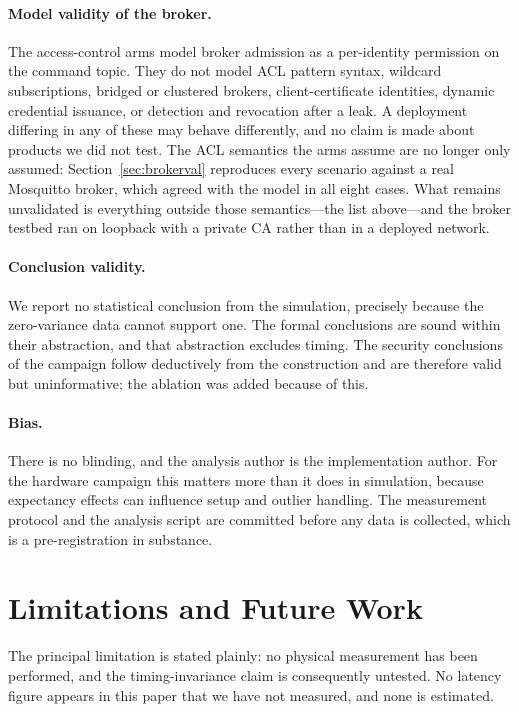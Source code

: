 \paragraph{Model validity of the broker.} The access-control arms model broker admission as a
per-identity permission on the command topic. They do not model ACL pattern syntax, wildcard
subscriptions, bridged or clustered brokers, client-certificate identities, dynamic credential
issuance, or detection and revocation after a leak. A deployment differing in any of these may
behave differently, and no claim is made about products we did not test. The ACL semantics the arms assume are
no longer only assumed: Section~\ref{sec:brokerval} reproduces every scenario against a real
Mosquitto broker, which agreed with the model in all eight cases. What remains unvalidated is
everything outside those semantics---the list above---and the broker testbed ran on loopback
with a private CA rather than in a deployed network.

\paragraph{Conclusion validity.} We report no statistical conclusion from the simulation,
precisely because the zero-variance data cannot support one. The formal conclusions are sound
within their abstraction, and that abstraction excludes timing. The security conclusions of the
campaign follow deductively from the construction and are therefore valid but uninformative;
the ablation was added because of this.

\paragraph{Bias.} There is no blinding, and the analysis author is the implementation author. For
the hardware campaign this matters more than it does in simulation, because expectancy effects
can influence setup and outlier handling. The measurement protocol and the analysis script are
committed before any data is collected, which is a pre-registration in substance.

\section{Limitations and Future Work}\label{sec:limitations}

The principal limitation is stated plainly: no physical measurement has been performed, and the
timing-invariance claim is consequently untested. No latency figure appears in this paper that we
have not measured, and none is estimated.

